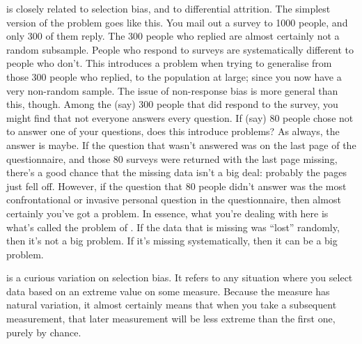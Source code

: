  is closely related to selection bias, and to differential attrition. The simplest version of the problem goes like this. You mail out a survey to 1000 people, and only 300 of them reply. The 300 people who replied are almost certainly not a random subsample. People who respond to surveys are systematically different to people who don't. This introduces a problem when trying to generalise from those 300 people who replied, to the population at large; since you now have a very non-random sample. The issue of non-response bias is more general than this, though. Among the (say) 300 people that did respond to the survey, you might find that not everyone answers every question. If (say) 80 people chose not to answer one of your questions, does this introduce problems? As always, the answer is maybe. If the question that wasn't answered was on the last page of the questionnaire, and those 80 surveys were returned with the last page missing, there's a good chance that the missing data isn't a big deal: probably the pages just fell off.  However, if the question that 80 people didn't answer was the most confrontational or invasive personal question in the questionnaire, then almost certainly you've got a problem. In essence, what you're dealing with here is what's called the problem of . If the data that is missing was ``lost'' randomly, then it's not a big problem. If it's missing systematically, then it can be a big problem.




 is a curious variation on selection bias. It refers to any situation where you select data based on an extreme value on some measure. Because the measure has natural variation, it almost certainly means that when you take a subsequent measurement, that later measurement will be less extreme than the first one, purely by chance. 


